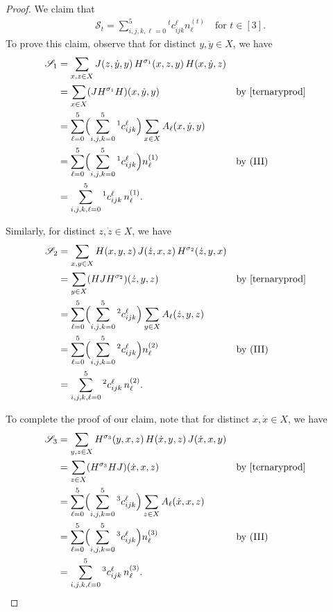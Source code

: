 \documentclass[11pt,oneside]{amsart}
\begin{document}
{\begin{proof}
We claim that 
\begin{align*}
     \mathscr  S_t=\sum_{i,j,k,\ell=0}^5 {^t c_{ijk}^\ell} n_\ell^{(t)} \quad \text{for } t\in[3].
\end{align*}
To prove this claim, observe that for distinct $y,\dot y\in X$, we have
\begin{align*}
\mathscr{S}_1
&= \sum_{x,z\in X} J(z,\dot{y},y)\, H^{\sigma_1}(x,z,y)\, H(x,\dot{y},z) \\
&= \sum_{x\in X} (J H^{\sigma_1} H)(x,\dot{y},y)
&& \text{by \eqref{ternaryprod}} \\
&= \sum_{\ell=0}^5 \Bigl(\sum_{i,j,k=0}^5 {^1 c_{ijk}^\ell}\Bigr)
    \sum_{x\in X} A_\ell(x,\dot{y},y) \\
&= \sum_{\ell=0}^5 \Bigl(\sum_{i,j,k=0}^5 {^1 c_{ijk}^\ell}\Bigr)
    n_\ell^{(1)}
&& \text{by (III)} \\
&= \sum_{i,j,k,\ell=0}^5 {^1 c_{ijk}^\ell}\, n_\ell^{(1)}.
\end{align*}
 
Similarly, for distinct $z,\dot z\in X$, we have 
\begin{align*}
\mathscr{S}_2
&= \sum_{x,y\in X} H(x,y,z)\, J(\dot{z},x,z)\, H^{\sigma_2}(\dot{z},y,x) \\
&= \sum_{y\in X} (H J H^{\sigma_2})(\dot{z},y,z)
&& \text{by \eqref{ternaryprod}} \\
&= \sum_{\ell=0}^5 \Bigl(\sum_{i,j,k=0}^5 {^2 c_{ijk}^\ell}\Bigr)
    \sum_{y\in X} A_\ell(\dot{z},y,z) \\
&= \sum_{\ell=0}^5 \Bigl(\sum_{i,j,k=0}^5 {^2 c_{ijk}^\ell}\Bigr)
    n_\ell^{(2)}
&& \text{by (III)} \\
&= \sum_{i,j,k,\ell=0}^5 {^2 c_{ijk}^\ell}\, n_\ell^{(2)}.
\end{align*}

To complete the proof of our claim,  note that for   distinct $x,\dot x\in X$, we have
\begin{align*}
\mathscr{S}_3
&= \sum_{y,z\in X} H^{\sigma_3}(y,x,z)\,H(\dot{x},y,z)\,J(\dot{x},x,y) \\
&= \sum_{z\in X} (H^{\sigma_3} H J)(\dot{x},x,z)
&& \text{by \eqref{ternaryprod}} \\
&= \sum_{\ell=0}^5 \Bigl(\sum_{i,j,k=0}^5 {^3 c_{ijk}^\ell}\Bigr)
    \sum_{z\in X} A_\ell(\dot{x},x,z) \\
&= \sum_{\ell=0}^5 \Bigl(\sum_{i,j,k=0}^5 {^3 c_{ijk}^\ell}\Bigr)
    n_\ell^{(3)}
&& \text{by (III)} \\
&= \sum_{i,j,k,\ell=0}^5 {^3 c_{ijk}^\ell}\, n_\ell^{(3)}.
\end{align*}


\end{proof}}
\end{document}
